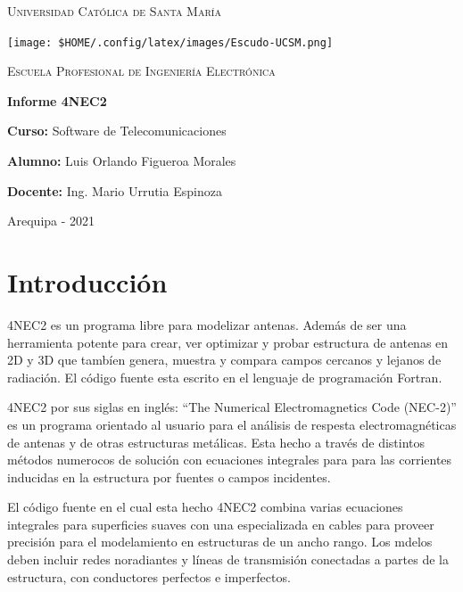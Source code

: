 \documentclass[12pt]{article}
\begin{document}
\begin{titlepage}
    \centering
    {\scshape\LARGE Universidad Católica de Santa María \par}
    \vspace{3em}
    \texttt{[image: \$HOME/.config/latex/images/Escudo-UCSM.png]}\par\vspace{3em}
    \vspace{1cm}
    {\scshape\Large Escuela Profesional de Ingeniería Electrónica \par}
    \vspace{1.5cm}
    {\huge\bfseries Informe 4NEC2\par}   %
    \vspace{2cm}
    \large
    {\bfseries Curso:} Software de Telecomunicaciones\par
    {\bfseries Alumno:} Luis Orlando Figueroa Morales\par
    {\bfseries Docente:} Ing. Mario Urrutia Espinoza 

    \vfill

    {\small Arequipa - 2021\par}
\end{titlepage}

\section{Introducción}

4NEC2 es un programa libre para modelizar antenas. Además de ser una
herramienta potente para crear, ver optimizar y probar estructura de antenas en
2D y 3D que tambíen genera, muestra y compara campos cercanos y lejanos de
radiación. El código fuente esta escrito en el lenguaje de programación Fortran.

4NEC2 por sus siglas en inglés: ``The Numerical Electromagnetics Code (NEC-2)''
es un programa orientado al usuario para el análisis de respesta
electromagnéticas de antenas y de otras estructuras metálicas. Esta hecho a
través de distintos métodos numerocos de solución con ecuaciones integrales
para para las corrientes inducidas en la estructura por fuentes o campos
incidentes.

El código fuente en el cual esta hecho 4NEC2 combina varias ecuaciones
integrales para superficies suaves con una especializada en cables para proveer
precisión para el modelamiento en estructuras de un ancho rango. Los mdelos
deben incluir redes noradiantes y líneas de transmisión conectadas a partes de
la estructura, con conductores perfectos e imperfectos.
\end{document}
